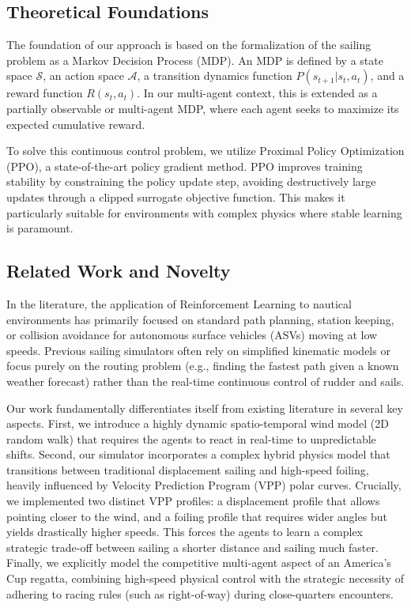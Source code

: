 \documentclass{article}
\begin{document}
\subsection{Theoretical Foundations}
The foundation of our approach is based on the formalization of the sailing problem as a Markov Decision Process (MDP). An MDP is defined by a state space $\mathcal{S}$, an action space $\mathcal{A}$, a transition dynamics function $P(s_{t+1}|s_t, a_t)$, and a reward function $R(s_t, a_t)$. In our multi-agent context, this is extended as a partially observable or multi-agent MDP, where each agent seeks to maximize its expected cumulative reward. 

To solve this continuous control problem, we utilize Proximal Policy Optimization (PPO), a state-of-the-art policy gradient method. PPO improves training stability by constraining the policy update step, avoiding destructively large updates through a clipped surrogate objective function. This makes it particularly suitable for environments with complex physics where stable learning is paramount.

\subsection{Related Work and Novelty}
In the literature, the application of Reinforcement Learning to nautical environments has primarily focused on standard path planning, station keeping, or collision avoidance for autonomous surface vehicles (ASVs) moving at low speeds. Previous sailing simulators often rely on simplified kinematic models or focus purely on the routing problem (e.g., finding the fastest path given a known weather forecast) rather than the real-time continuous control of rudder and sails.

Our work fundamentally differentiates itself from existing literature in several key aspects. First, we introduce a highly dynamic spatio-temporal wind model (2D random walk) that requires the agents to react in real-time to unpredictable shifts. Second, our simulator incorporates a complex hybrid physics model that transitions between traditional displacement sailing and high-speed foiling, heavily influenced by Velocity Prediction Program (VPP) polar curves. Crucially, we implemented two distinct VPP profiles: a displacement profile that allows pointing closer to the wind, and a foiling profile that requires wider angles but yields drastically higher speeds. This forces the agents to learn a complex strategic trade-off between sailing a shorter distance and sailing much faster. Finally, we explicitly model the competitive multi-agent aspect of an America's Cup regatta, combining high-speed physical control with the strategic necessity of adhering to racing rules (such as right-of-way) during close-quarters encounters.
\end{document}
